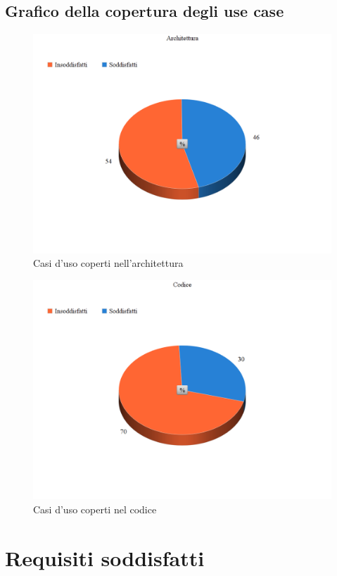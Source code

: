 \documentclass[openany,12pt,a4paper]{report}
\begin{document}
	\section{Grafico della copertura degli use case}
		\begin{figure}[H]
		\includegraphics[scale=0.38]{casi_d'uso_Architettura}
		\centering
		\caption{Casi d’uso coperti nell'architettura}
	\end{figure}
	\begin{figure}[H]
		\includegraphics[scale=0.38]{casi_d'uso_codice}
		\centering
		\caption{Casi d’uso coperti nel codice}
	\end{figure}
	\chapter{Requisiti soddisfatti}
	
\end{document}
